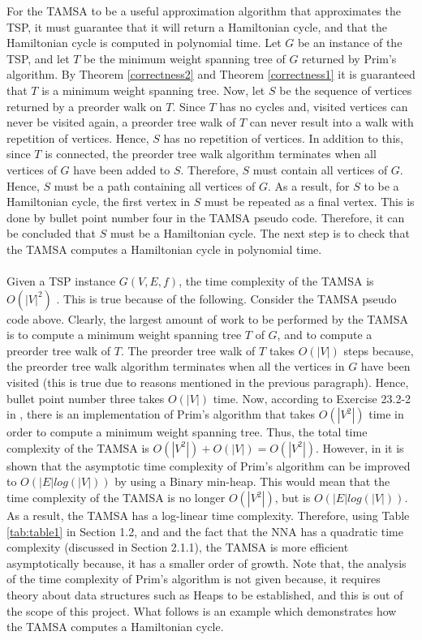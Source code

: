 \documentclass{article}
\begin{document}
For the TAMSA to be a useful approximation algorithm that approximates the TSP, it must guarantee that it will return a Hamiltonian cycle, and that the Hamiltonian cycle is computed in polynomial time. Let $G$ be an instance of the TSP, and let $T$ be the minimum weight spanning tree of $G$ returned by Prim's algorithm. By Theorem \ref{correctness2} and Theorem \ref{correctness1} it is guaranteed that $T$ is a minimum weight spanning tree. Now, let $S$ be the sequence of vertices returned by a preorder walk on $T$. Since $T$ has no cycles and, visited vertices can never be visited again, a preorder tree walk of $T$ can never result into a walk with repetition of vertices. Hence, $S$ has no repetition of vertices. In addition to this, since $T$ is connected, the preorder tree walk algorithm terminates when all vertices of $G$ have been added to $S$. Therefore, $S$ must contain all vertices of $G$. Hence, $S$ must be a path containing all vertices of $G$. As a result, for $S$ to be a Hamiltonian cycle, the first vertex in $S$ must be repeated as a final vertex. This is done by bullet point number four in the TAMSA pseudo code. Therefore, it can be concluded that $S$ must be a Hamiltonian cycle. The next step is to check that the TAMSA computes a Hamiltonian cycle in polynomial time.\\\\
Given a TSP instance $G(V,E,f)$, the time complexity of the TAMSA is $O(|V|^2)$ \cite{cormen_leiserson_rivest_stein}. This is true because of the following. Consider the TAMSA pseudo code above. Clearly, the largest amount of work to be performed by the TAMSA is to compute a minimum weight spanning tree $T$ of $G$, and to compute a preorder tree walk of $T$. The preorder tree walk of $T$ takes $O(|V|)$ steps because, the preorder tree walk algorithm terminates when all the vertices in $G$ have been visited (this is true due to reasons mentioned in the previous paragraph). Hence, bullet point number three takes $O(|V|)$ time. Now, according to Exercise 23.2-2 in \cite{cormen_leiserson_rivest_stein}, there is an implementation of Prim's algorithm that takes $O(|V^2|)$ time in order to compute a minimum weight spanning tree. Thus, the total time complexity of the TAMSA is $O(|V^2|)+ O(|V|) = O(|V^2|)$. However, in \cite{cormen_leiserson_rivest_stein} it is shown that the asymptotic time complexity of Prim's algorithm can be improved to $O(|E| log(|V|))$ by using a Binary min-heap. This would mean that the time complexity of the TAMSA is no longer $O(|V^2|)$, but is $O(|E| log(|V|))$. As a result, the TAMSA has a log-linear time complexity. Therefore, using Table \ref{tab:table1} in Section 1.2, and and the fact that the NNA has a quadratic time complexity (discussed in Section 2.1.1), the TAMSA is more efficient asymptotically because, it has a smaller order of growth. Note that, the analysis of the time complexity of Prim's algorithm is not given because, it requires theory about data structures such as Heaps to be established, and this is out of the scope of this project. What follows is an example which demonstrates how the TAMSA computes a Hamiltonian cycle.
\end{document}
